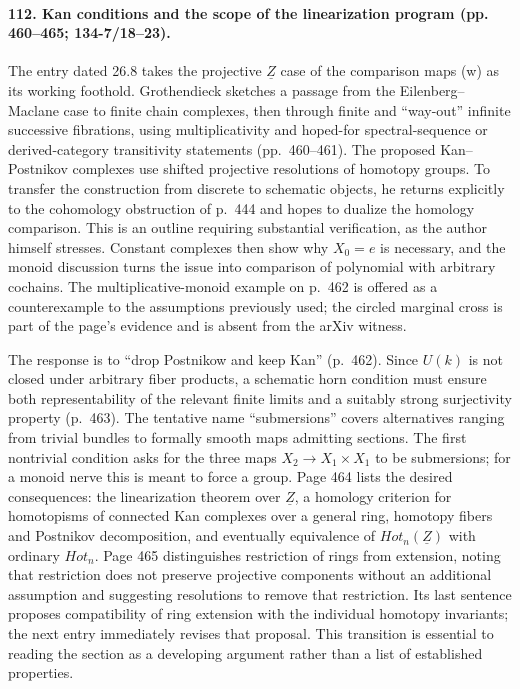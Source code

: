 \paragraph{112. Kan conditions and the scope of the linearization program (pp. 460--465; 134-7/18--23).}
The entry dated 26.8 takes the projective $\underline Z$ case of the comparison maps (w) as its working foothold. Grothendieck sketches a passage from the Eilenberg--Maclane case to finite chain complexes, then through finite and ``way-out'' infinite successive fibrations, using multiplicativity and hoped-for spectral-sequence or derived-category transitivity statements (pp.~460--461). The proposed Kan--Postnikov complexes use shifted projective resolutions of homotopy groups. To transfer the construction from discrete to schematic objects, he returns explicitly to the cohomology obstruction of p.~444 and hopes to dualize the homology comparison. This is an outline requiring substantial verification, as the author himself stresses. Constant complexes then show why $X_0=e$ is necessary, and the monoid discussion turns the issue into comparison of polynomial with arbitrary cochains. The multiplicative-monoid example on p.~462 is offered as a counterexample to the assumptions previously used; the circled marginal cross is part of the page's evidence and is absent from the arXiv witness.

The response is to ``drop Postnikow and keep Kan'' (p.~462). Since $U(k)$ is not closed under arbitrary fiber products, a schematic horn condition must ensure both representability of the relevant finite limits and a suitably strong surjectivity property (p.~463). The tentative name ``submersions'' covers alternatives ranging from trivial bundles to formally smooth maps admitting sections. The first nontrivial condition asks for the three maps $X_2\to X_1\times X_1$ to be submersions; for a monoid nerve this is meant to force a group. Page 464 lists the desired consequences: the linearization theorem over $\underline Z$, a homology criterion for homotopisms of connected Kan complexes over a general ring, homotopy fibers and Postnikov decomposition, and eventually equivalence of $Hot_n(\underline Z)$ with ordinary $Hot_n$. Page 465 distinguishes restriction of rings from extension, noting that restriction does not preserve projective components without an additional assumption and suggesting resolutions to remove that restriction. Its last sentence proposes compatibility of ring extension with the individual homotopy invariants; the next entry immediately revises that proposal. This transition is essential to reading the section as a developing argument rather than a list of established properties.

